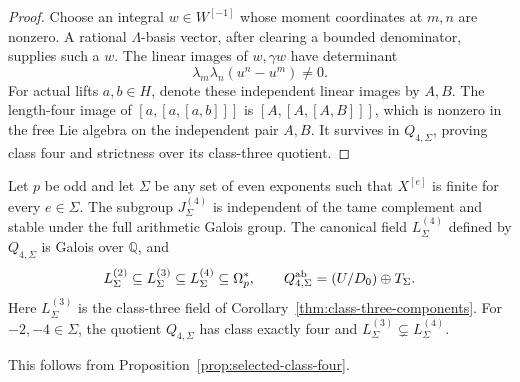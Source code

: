 \begin{proof}
Choose an integral $w\in W^{[-1]}$ whose moment
coordinates at $m,n$ are nonzero. A rational
$\Lambda$-basis vector, after clearing a bounded
denominator, supplies such a $w$. The linear images
of $w,\gamma w$ have determinant
\[
                   \lambda_m\lambda_n(u^n-u^m)\ne0.
\]
For actual lifts $a,b\in H$, denote these independent
linear images by $A,B$. The length-four image of
$[a,[a,[a,b]]]$ is $[A,[A,[A,B]]]$, which is nonzero
in the free Lie algebra on the independent pair
$A,B$. It survives in $Q_{4,\Sigma}$, proving class
four and strictness over its class-three quotient.
\end{proof}

\begin{corollary}
\label{thm:class-four-components}
Let $p$ be odd and let $\Sigma$ be any set of even exponents
such that $X^{[e]}$ is finite for every $e\in\Sigma$.
The subgroup $J_\Sigma^{(4)}$ is independent of the tame
complement and stable under the full arithmetic Galois group.
The canonical field $L_\Sigma^{(4)}$ defined by $Q_{4,\Sigma}$
is Galois over $\mathbb Q$, and
\[
 L_\Sigma^{(2)}\subseteq L_\Sigma^{(3)}
   \subseteq L_\Sigma^{(4)}\subseteq\Omega_p^*,\qquad
 Q_{4,\Sigma}^{\rm ab}=(U/D_0)\oplus T_\Sigma.
\]
Here $L_\Sigma^{(3)}$ is the class-three field of
Corollary~\ref{thm:class-three-components}.
For $-2,-4\in\Sigma$, the quotient $Q_{4,\Sigma}$ has class
exactly four and $L_\Sigma^{(3)}\subsetneq L_\Sigma^{(4)}$.
\end{corollary}
This follows from Proposition~\ref{prop:selected-class-four}.
